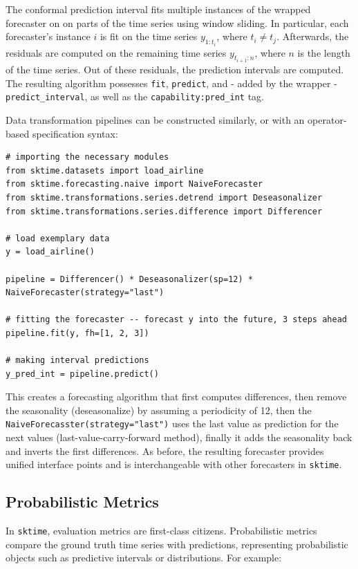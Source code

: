 The conformal prediction interval fits multiple instances of the wrapped forecaster on on parts of the time series using window sliding. In particular, each forecaster's instance $i$
is fit on the time series $y_{1:t_i}$, where $t_i \neq t_j$. Afterwards, the residuals are computed on the remaining time series $y_{t_{i+1}:n}$, where $n$ is the length of the time series.
Out of these residuals, the prediction intervals are computed.
The resulting algorithm possesses \texttt{fit}, \texttt{predict}, and - added by the wrapper - \texttt{predict\_interval}, as well as the \texttt{capability:pred\_int} tag.

Data transformation pipelines can be constructed similarly, or with an operator-based specification syntax:

\begin{verbatim}
# importing the necessary modules
from sktime.datasets import load_airline
from sktime.forecasting.naive import NaiveForecaster
from sktime.transformations.series.detrend import Deseasonalizer
from sktime.transformations.series.difference import Differencer

# load exemplary data
y = load_airline()

pipeline = Differencer() * Deseasonalizer(sp=12) * NaiveForecaster(strategy="last")

# fitting the forecaster -- forecast y into the future, 3 steps ahead
pipeline.fit(y, fh=[1, 2, 3])

# making interval predictions
y_pred_int = pipeline.predict()
\end{verbatim}

This creates a forecasting algorithm that first computes differences, then remove the seasonality (deseasonalize) by assuming a periodicity of 12, 
then the \texttt{NaiveForecasster(strategy="last")} uses the last value as prediction for the next values (last-value-carry-forward method), finally it adds the seasonality back
and inverts the first differences.
As before, the resulting forecaster provides unified interface points and is interchangeable with other forecasters in \texttt{sktime}.

\subsection{Probabilistic Metrics}
In \texttt{sktime}, evaluation metrics are first-class citizens. Probabilistic metrics compare the ground truth time series with predictions, representing probabilistic objects such as predictive intervals or distributions. For example:

